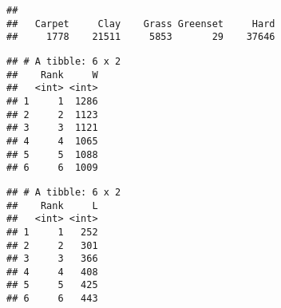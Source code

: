 \documentclass[]{article}
\newenvironment{Shaded}{\begin{snugshade}}{\end{snugshade}}
\newcommand{\DataTypeTok}[1]{\textcolor[rgb]{0.13,0.29,0.53}{#1}}
\newcommand{\DecValTok}[1]{\textcolor[rgb]{0.00,0.00,0.81}{#1}}
\newcommand{\KeywordTok}[1]{\textcolor[rgb]{0.13,0.29,0.53}{\textbf{#1}}}
\newcommand{\NormalTok}[1]{#1}
\newcommand{\OperatorTok}[1]{\textcolor[rgb]{0.81,0.36,0.00}{\textbf{#1}}}
\newcommand{\StringTok}[1]{\textcolor[rgb]{0.31,0.60,0.02}{#1}}
\begin{document}
\begin{verbatim}
## 
##   Carpet     Clay    Grass Greenset     Hard 
##     1778    21511     5853       29    37646
\end{verbatim}

\begin{Shaded}
\end{Shaded}

\begin{verbatim}
## # A tibble: 6 x 2
##    Rank     W
##   <int> <int>
## 1     1  1286
## 2     2  1123
## 3     3  1121
## 4     4  1065
## 5     5  1088
## 6     6  1009
\end{verbatim}

\begin{Shaded}
\end{Shaded}

\begin{verbatim}
## # A tibble: 6 x 2
##    Rank     L
##   <int> <int>
## 1     1   252
## 2     2   301
## 3     3   366
## 4     4   408
## 5     5   425
## 6     6   443
\end{verbatim}

\begin{Shaded}
\end{Shaded}
\end{document}
